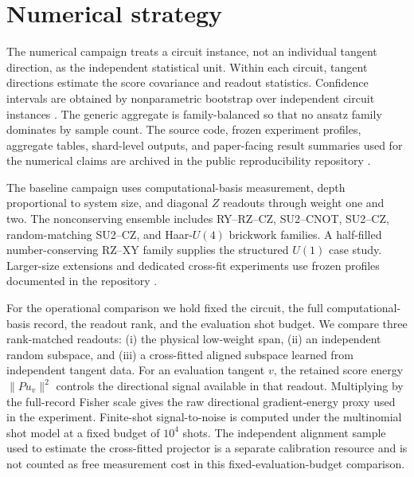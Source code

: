 \documentclass[aps,pra,reprint,superscriptaddress,nofootinbib,longbibliography]{revtex4-2}
\begin{document}
\section{Numerical strategy}

The numerical campaign treats a circuit instance, not an individual tangent direction, as the independent statistical unit. Within each circuit, tangent directions estimate the score covariance and readout statistics. Confidence intervals are obtained by nonparametric bootstrap over independent circuit instances \cite{Efron1979}. The generic aggregate is family-balanced so that no ansatz family dominates by sample count. The source code, frozen experiment profiles, aggregate tables, shard-level outputs, and paper-facing result summaries used for the numerical claims are archived in the public reproducibility repository \cite{AitHaddou2026MeasurementAccessible}.

The baseline campaign uses computational-basis measurement, depth proportional to system size, and diagonal $Z$ readouts through weight one and two. The nonconserving ensemble includes RY--RZ--CZ, SU2--CNOT, SU2--CZ, random-matching SU2--CZ, and Haar-$U(4)$ brickwork families. A half-filled number-conserving RZ--XY family supplies the structured $U(1)$ case study. Larger-size extensions and dedicated cross-fit experiments use frozen profiles documented in the repository \cite{AitHaddou2026MeasurementAccessible}.

For the operational comparison we hold fixed the circuit, the full computational-basis record, the readout rank, and the evaluation shot budget. We compare three rank-matched readouts: (i) the physical low-weight span, (ii) an independent random subspace, and (iii) a cross-fitted aligned subspace learned from independent tangent data. For an evaluation tangent $v$, the retained score energy $\|P u_v\|^2$ controls the directional signal available in that readout. Multiplying by the full-record Fisher scale gives the raw directional gradient-energy proxy used in the experiment. Finite-shot signal-to-noise is computed under the multinomial shot model at a fixed budget of $10^4$ shots. The independent alignment sample used to estimate the cross-fitted projector is a separate calibration resource and is not counted as free measurement cost in this fixed-evaluation-budget comparison.
\end{document}

